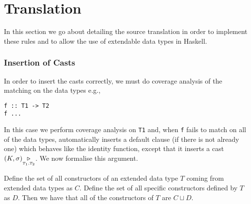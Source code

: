 \section{Translation}
\label{sec:translation}
In this section we go about detailing the source translation in order to
implement these rules and to allow the use of extendable data types in
Haskell.
\subsubsection{Insertion of Casts}

In order to insert the casts correctly, we must do coverage analysis of the
matching on the data types e.g.,
\begin{lstlisting}
f :: T1 -> T2
f ...
\end{lstlisting}
In this case we perform coverage analysis on {\tt T1} and, when {\tt f} fails to
match on all of the data types, automatically inserts a default clause (if
there is not already one) which behaves like the identity function, except
that it inserts a cast $(K,\sigma) {\underset{{\scriptscriptstyle T_1,T_2}}{\triangleright}}$. We
now formalise this argument.

Define the set of all constructors of an extended data type $T$ 
coming from extended data types as $C$. Define the set of all specific
constructors defined by $T$ as $D$. Then we have that all of the
constructors of $T$ are $C \sqcup D$.

